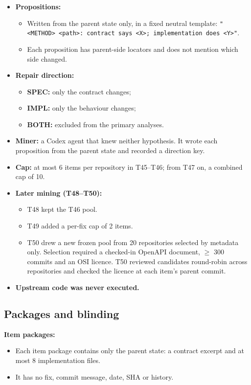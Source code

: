 \documentclass[acmsmall,screen,review,anonymous]{acmart}
\begin{document}
\begin{itemize}
\begin{itemize}
\item New features with their docs are not accepted.
\item Changes that move both artifacts to new behaviour are not accepted either.
\end{itemize}
\item \textbf{Propositions:}
\begin{itemize}
\item Written from the parent state only, in a fixed neutral template: \texttt{"\textless{}METHOD\textgreater{} \textless{}path\textgreater{}: contract says \textless{}X\textgreater{}; implementation does \textless{}Y\textgreater{}"}.
\item Each proposition has parent-side locators and does not mention which side changed.
\end{itemize}
\item \textbf{Repair direction:}
\begin{itemize}
\item \textbf{SPEC:} only the contract changes;
\item \textbf{IMPL:} only the behaviour changes;
\item \textbf{BOTH:} excluded from the primary analyses.
\end{itemize}
\item \textbf{Miner:} a Codex agent that knew neither hypothesis. It wrote each proposition from the parent state and recorded a direction key.
\item \textbf{Cap:} at most 6 items per repository in T45--T46; from T47 on, a combined cap of 10.
\item \textbf{Later mining (T48--T50):}
\begin{itemize}
\item T48 kept the T46 pool.
\item T49 added a per-fix cap of 2 items.
\item T50 drew a new frozen pool from 20 repositories selected by metadata only. Selection required a checked-in OpenAPI document, $\geq$ 300 commits and an OSI licence. T50 reviewed candidates round-robin across repositories and checked the licence at each item's parent commit.
\end{itemize}
\item \textbf{Upstream code was never executed.}
\end{itemize}

\subsection{Packages and blinding}
\textbf{Item packages:}
\begin{itemize}
\item Each item package contains only the parent state: a contract excerpt and at most 8 implementation files.
\item It has no fix, commit message, date, SHA or history.
\end{itemize}
\end{document}
